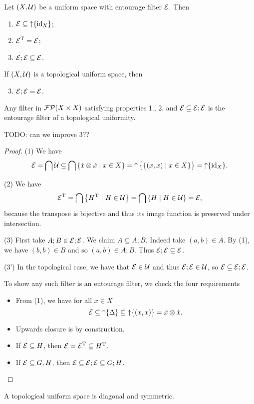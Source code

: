 \begin{lemma} \label{entourageLemma}
Let $\sSet{X,\mathcal{U}}$ be a uniform space with entourage filter $\operatorname{\mathcal{E}}$. Then
\begin{enumerate}
\item $\operatorname{\mathcal{E}}\subseteq \operatorname{\uparrow}\{\operatorname{id}_X\}$;
\item $\operatorname{\mathcal{E}}^{\mathrm{T}} = \operatorname{\mathcal{E}}$;
\item $\operatorname{\mathcal{E}};\operatorname{\mathcal{E}} \subseteq \operatorname{\mathcal{E}}$.
\end{enumerate}
If $\sSet{X,\mathcal{U}}$ is a topological uniform space, then
\begin{enumerate}[1'.] \setcounter{enumi}{2}
\item $\operatorname{\mathcal{E}};\operatorname{\mathcal{E}} = \operatorname{\mathcal{E}}$.
\end{enumerate}
Any filter in $\operatorname{\mathcal{FP}}(X\times X)$ satisfying properties 1., 2. and $\operatorname{\mathcal{E}} \subseteq \operatorname{\mathcal{E}};\operatorname{\mathcal{E}}$ is the entourage filter of a topological uniformity.
\end{lemma}
TODO: can we improve 3??
\begin{proof}
(1) We have
\[ \entourage = \bigcap \mathcal{U} \subseteq \bigcap \setbuilder{\pfilter{x}\otimes \pfilter{x}}{x\in X} = \upset\big\{\setbuilder{(x,x)}{x\in X}\big\} = \upset\{\id_X\}. \]

(2) We have
\[ \entourage^\transp = \bigcap \setbuilder{H^\transp}{H\in\mathcal{U}} = \bigcap \setbuilder{H}{H\in\mathcal{U}} = \entourage, \]
because the transpose is bijective and thus its image function is preserved under intersection.

(3) First take $A;B \in\operatorname{\mathcal{E}};\operatorname{\mathcal{E}}$. We claim $A\subseteq A;B$. Indeed take $(a,b)\in A$. By (1), we have $(b,b)\in B$ and so $(a,b)\in A;B$. Thus $\operatorname{\mathcal{E}};\operatorname{\mathcal{E}} \subseteq \operatorname{\mathcal{E}}$.

(3') In the topological case, we have that $\operatorname{\mathcal{E}}\in\mathcal{U}$ and thus $\operatorname{\mathcal{E}};\operatorname{\mathcal{E}}\in \mathcal{U}$, so $\operatorname{\mathcal{E}} \subseteq \operatorname{\mathcal{E}};\operatorname{\mathcal{E}}$.

To show any such filter is an entourage filter, we check the four requirements
\begin{itemize}
\item From (1), we have for all $x\in X$
\[ \operatorname{\mathcal{E}} \subseteq \operatorname{\uparrow}\{\Delta\} \subseteq \operatorname{\uparrow}\{(x,x)\} = \dot{x}\otimes\dot{x}. \]
\item Upwards closure is by construction.
\item If $\operatorname{\mathcal{E}} \subseteq H$, then $\operatorname{\mathcal{E}} = \operatorname{\mathcal{E}}^{\mathrm{T}} \subseteq H^{\mathrm{T}}$.
\item If $\operatorname{\mathcal{E}}\subseteq G,H$, then $\operatorname{\mathcal{E}} \subseteq \operatorname{\mathcal{E}};\operatorname{\mathcal{E}} \subseteq G;H$.
\end{itemize}
\end{proof}
\begin{corollary}
A topological uniform space is diagonal and symmetric.
\end{corollary}

